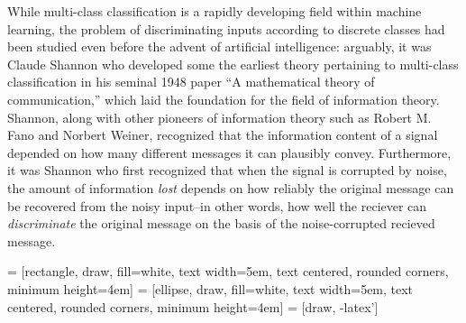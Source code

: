 While multi-class classification is a rapidly developing field within
machine learning, the problem of discriminating inputs according to
discrete classes had been studied even before the advent of artificial
intelligence: arguably, it was Claude Shannon who developed some the
earliest theory pertaining to multi-class classification in his
seminal 1948 paper ``A mathematical theory of communication,'' which
laid the foundation for the field of information theory.  Shannon,
along with other pioneers of information theory such as Robert M. Fano
and Norbert Weiner, recognized that the information content of a
signal depended on how many different messages it can plausibly
convey.  Furthermore, it was Shannon who first recognized that when
the signal is corrupted by noise, the amount of information
\emph{lost} depends on how reliably the original message can be
recovered from the noisy input--in other words, how well the reciever
can \emph{discriminate} the original message on the basis of the
noise-corrupted recieved message.  %

 = [rectangle, draw, fill=white, 
    text width=5em, text centered, rounded corners, minimum height=4em]
 = [ellipse, draw, fill=white, 
    text width=5em, text centered, rounded corners, minimum height=4em]
 = [draw, -latex']
    

